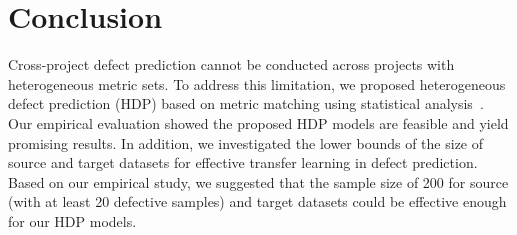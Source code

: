 \section{Conclusion}
\label{sec:Conclusion}

Cross-project defect prediction cannot be conducted across projects
with heterogeneous metric sets. To address
this limitation, we proposed heterogeneous defect prediction (HDP) based on
metric matching using statistical analysis~\cite{Massey51}. Our empirical evaluation
showed the proposed HDP models are feasible and yield promising results. In addition, we investigated the lower bounds of the size of source and target datasets for effective transfer learning in defect prediction. Based on our empirical study, we suggested that the sample size of 200 for source (with at least 20 defective samples) and target datasets could be effective enough for our HDP models.




